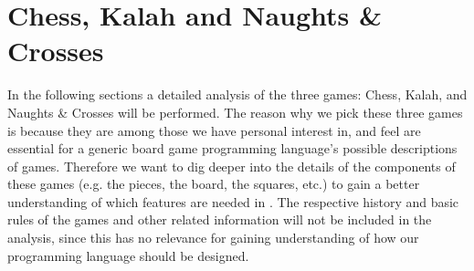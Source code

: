 \section{Chess, Kalah and Naughts \& Crosses}

In the following sections a detailed analysis of the three games: Chess,
Kalah, and Naughts \& Crosses will be performed. The reason why we pick
these three games is because they are among those we have personal
interest in, and feel are essential for a generic board game programming
language's possible descriptions of games. Therefore we want to dig
deeper into the details of the components of these games (e.g. the
pieces, the board, the squares, etc.) to gain a better understanding
of which features are needed in \productname. The respective history
and basic rules of the games and other related information will not
be included in the analysis, since this has no relevance for gaining
understanding of how our programming language should be designed.



      

